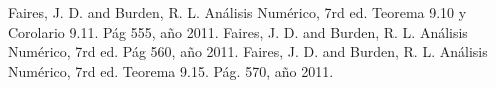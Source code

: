 

\begin{thebibliography}{1}
Faires, J. D. and Burden, R. L. Análisis Numérico, 7rd ed. Teorema 9.10 y Corolario 9.11. Pág 555, año 2011.
Faires, J. D. and Burden, R. L. Análisis Numérico, 7rd ed. Pág 560, año 2011.	
Faires, J. D. and Burden, R. L. Análisis Numérico, 7rd ed. Teorema 9.15. Pág. 570, año 2011.
\end{thebibliography} 